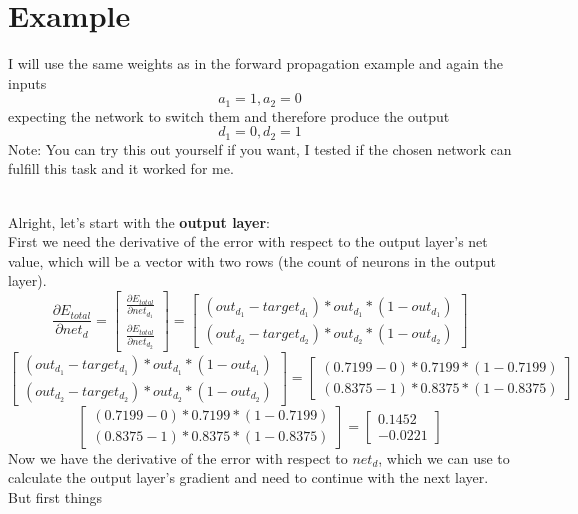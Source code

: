 \documentclass[11pt, halfparskip]{article}
\begin{document}
    \newpage
    \section{Example}
    \label{sec:example}
    I will use the same weights as in the forward propagation example and again the inputs
    \[
    	a_1 = 1, a_2 = 0
    \]
    expecting the network to switch them and therefore produce the output
    \[
    	d_1 = 0, d_2 = 1
    \]
    Note: You can try this out yourself if you want, I tested if the chosen network can fulfill this task and it worked for me.
    
    \noindent \\
    Alright, let's start with the \textbf{output layer}:\\
    First we need the derivative of the error with respect to the output layer's net value, which will be a vector with two rows (the count of neurons in the output layer).
    \[
    	\frac{\partial E_{total}}{\partial net_d} = 
    	\begin{bmatrix}
    		\frac{\partial E_{total}}{\partial net_{d_1}}\\
    		\frac{\partial E_{total}}{\partial net_{d_2}}
    	\end{bmatrix}
    	=
    	\begin{bmatrix}
    		(out_{d_1} - target_{d_1}) * out_{d_1} * (1 - out_{d_1})\\
    		(out_{d_2} - target_{d_2}) * out_{d_2} * (1 - out_{d_2})
    	\end{bmatrix}
    \]
    \[
    	\begin{bmatrix}
    		(out_{d_1} - target_{d_1}) * out_{d_1} * (1 - out_{d_1})\\
    		(out_{d_2} - target_{d_2}) * out_{d_2} * (1 - out_{d_2})
    	\end{bmatrix}
    	=
    	\begin{bmatrix}
    		(0.7199 - 0) * 0.7199 * (1 - 0.7199)\\
    		(0.8375 - 1) * 0.8375 * (1 - 0.8375)
    	\end{bmatrix}
    \]
    \[
    	\begin{bmatrix}
    		(0.7199 - 0) * 0.7199 * (1 - 0.7199)\\
    		(0.8375 - 1) * 0.8375 * (1 - 0.8375)
    	\end{bmatrix}
    	=
    	\begin{bmatrix}
    		0.1452\\
    		-0.0221
    	\end{bmatrix}
    \]
    Now we have the derivative of the error with respect to $net_d$, which we can use to calculate the output layer's gradient and need to continue with the next layer. But first things
\end{document}
